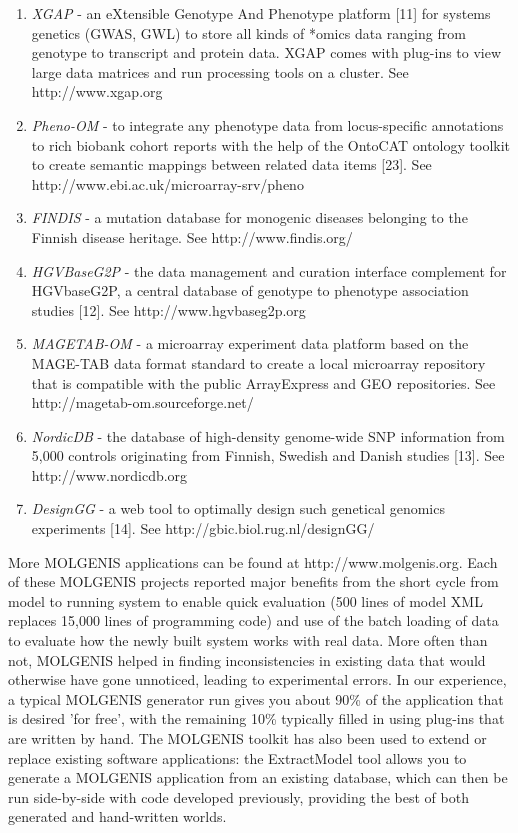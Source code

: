 \documentclass[8pt, twoside, a5paper]{report}
\newcommand{\italic}[1]{\textit{#1}}
\begin{document}
\begin{enumerate}\itemsep1pt
\item \italic{XGAP} - an eXtensible Genotype And Phenotype platform [11] for systems genetics (GWAS, GWL) to store all kinds of *omics 
data ranging from genotype to transcript and protein data. XGAP comes with plug-ins to view large data matrices and run 
processing tools on a cluster. See http://www.xgap.org
\item \italic{Pheno-OM} - to integrate any phenotype data from locus-specific annotations to rich biobank cohort reports with the help 
of the OntoCAT ontology toolkit to create semantic mappings between related data items [23]. See http://www.ebi.ac.uk/microarray-srv/pheno
\item \italic{FINDIS} - a mutation database for monogenic diseases belonging to the Finnish disease heritage. See http://www.findis.org/
\item \italic{HGVBaseG2P} - the data management and curation interface complement for HGVbaseG2P, a central database of genotype 
to phenotype association studies [12]. See http://www.hgvbaseg2p.org
\item \italic{MAGETAB-OM} - a microarray experiment data platform based on the MAGE-TAB data format standard to create a local 
microarray repository that is compatible with the public ArrayExpress and GEO repositories. See http://magetab-om.sourceforge.net/ 
\item \italic{NordicDB} - the database of high-density genome-wide SNP information from 5,000 controls originating from Finnish, 
Swedish and Danish studies [13]. See http://www.nordicdb.org
\item \italic{DesignGG} - a web tool to optimally design such genetical genomics experiments [14]. See http://gbic.biol.rug.nl/designGG/
\end{enumerate}

More MOLGENIS applications can be found at http://www.molgenis.org. Each of these MOLGENIS projects reported major 
benefits from the short cycle from model to running system to enable quick evaluation (500 lines of model XML replaces 
15,000 lines of programming code) and use of the batch loading of data to evaluate how the newly built system works with 
real data. More often than not, MOLGENIS helped in finding inconsistencies in existing data that would otherwise have gone 
unnoticed, leading to experimental errors. In our experience, a typical MOLGENIS generator run gives you about 90\% of 
the application that is desired 'for free', with the remaining 10\% typically filled in using plug-ins that are written 
by hand. The MOLGENIS toolkit has also been used to extend or replace existing software applications: the ExtractModel 
tool allows you to generate a MOLGENIS application from an existing database, which can then be run side-by-side with 
code developed previously, providing the best of both generated and hand-written worlds.
\end{document}
